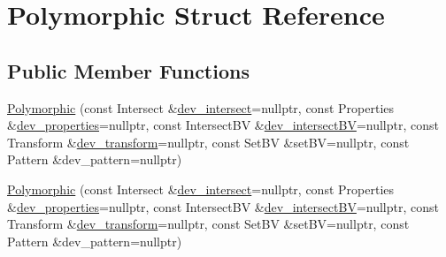 \hypertarget{struct_polymorphic}{}\section{Polymorphic Struct Reference}
\label{struct_polymorphic}
\subsection*{Public Member Functions}
\begin{DoxyCompactItemize}
\item 
\hyperlink{struct_polymorphic_a8a1a7aa3ea005bcf84bd8110d9b6a9f2}{Polymorphic} (const Intersect \&\hyperlink{group__device__pointers_ga00654ffb007d4b5c95c00b429dc26ae9}{dev\+\_\+intersect}=nullptr, const Properties \&\hyperlink{group__device__pointers_gac0d627981d2453b8f45dc3cca7a69a28}{dev\+\_\+properties}=nullptr, const Intersect\+BV \&\hyperlink{group__device__pointers_gaeee39cf2f67c91f2a6c312651283dc94}{dev\+\_\+intersect\+BV}=nullptr, const Transform \&\hyperlink{group__device__pointers_gac3760d5ca4da6826e005200738140558}{dev\+\_\+transform}=nullptr, const Set\+BV \&set\+BV=nullptr, const Pattern \&dev\+\_\+pattern=nullptr)
\item 
\hyperlink{struct_polymorphic_a8a1a7aa3ea005bcf84bd8110d9b6a9f2}{Polymorphic} (const Intersect \&\hyperlink{group__device__pointers_ga00654ffb007d4b5c95c00b429dc26ae9}{dev\+\_\+intersect}=nullptr, const Properties \&\hyperlink{group__device__pointers_gac0d627981d2453b8f45dc3cca7a69a28}{dev\+\_\+properties}=nullptr, const Intersect\+BV \&\hyperlink{group__device__pointers_gaeee39cf2f67c91f2a6c312651283dc94}{dev\+\_\+intersect\+BV}=nullptr, const Transform \&\hyperlink{group__device__pointers_gac3760d5ca4da6826e005200738140558}{dev\+\_\+transform}=nullptr, const Set\+BV \&set\+BV=nullptr, const Pattern \&dev\+\_\+pattern=nullptr)
\end{DoxyCompactItemize}
